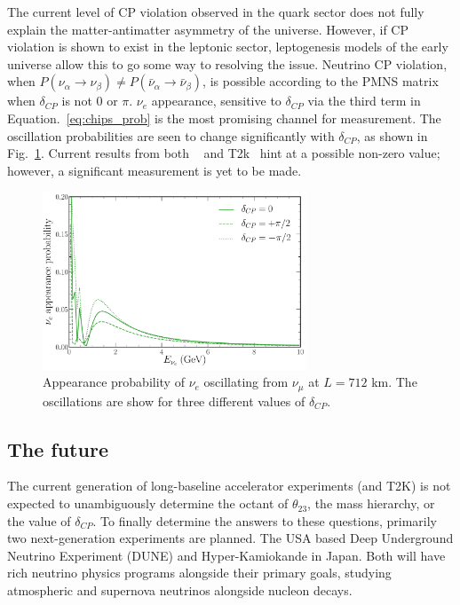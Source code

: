 The current level of CP violation observed in the quark sector does not fully explain the
matter-antimatter asymmetry of the universe. However, if CP violation is shown to exist in the
leptonic sector, leptogenesis models of the early universe allow this to go some way to resolving
the issue. Neutrino CP violation, when $P(\nu_{\alpha}\rightarrow\nu_{\beta}) \neq
    P(\bar{\nu}_{\alpha}\rightarrow\bar{\nu}_{\beta})$, is possible according to the PMNS matrix when
$\delta_{CP}$ is not 0 or $\pi$. $\nu_{e}$ appearance, sensitive to $\delta_{CP}$ via the third
term in Equation.~\ref{eq:chips_prob} is the most promising channel for measurement. The
oscillation probabilities are seen to change significantly with $\delta_{CP}$, as shown in
Fig.~\ref{fig:osc_cp_probs}. Current results from both \nova~\cite{acero2019} and
T2k~\cite{abe2018_2} hint at a possible non-zero value; however, a significant measurement is yet
to be made.

\begin{figure} %
    \includegraphics[origin=c,width=0.7\textwidth]{diagrams/7-results/explore_osc_cp_probs.pdf}
    \caption[$\nu_{e}$ appearance probability for different $\delta_{CP}$ values]
    {Appearance probability of $\nu_{e}$ oscillating from $\nu_{\mu}$ at $L=712$ km. The
        oscillations are show for three different values of $\delta_{CP}$.}
    \label{fig:osc_cp_probs}
\end{figure}

\subsection{The future} %
\label{sec:theory_status_future} %

The current generation of long-baseline accelerator experiments (\nova and T2K) is not expected to
unambiguously determine the octant of $\theta_{23}$, the mass hierarchy, or the value of
$\delta_{CP}$. To finally determine the answers to these questions, primarily two next-generation
experiments are planned. The USA based Deep Underground Neutrino Experiment (DUNE) and
Hyper-Kamiokande in Japan. Both will have rich neutrino physics programs alongside their primary
goals, studying atmospheric and supernova neutrinos alongside nucleon decays.

